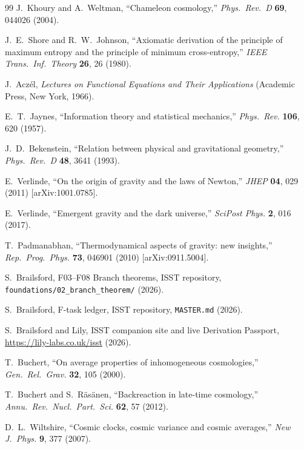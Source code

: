 \documentclass[aps,prd,twocolumn,nofootinbib,floatfix,superscriptaddress]{revtex4-2}
\begin{document}
\begin{thebibliography}{99}
 J.~Khoury and A.~Weltman, ``Chameleon
cosmology,'' \textit{Phys.~Rev.~D} \textbf{69}, 044026 (2004).

 J.~E.~Shore and R.~W.~Johnson, ``Axiomatic
derivation of the principle of maximum entropy and the principle of
minimum cross-entropy,'' \textit{IEEE Trans.~Inf.~Theory} \textbf{26},
26 (1980).

 J.~Acz\'el, \textit{Lectures on Functional
Equations and Their Applications} (Academic Press, New York, 1966).

 E.~T.~Jaynes, ``Information theory and
statistical mechanics,'' \textit{Phys.~Rev.} \textbf{106}, 620 (1957).

 J.~D.~Bekenstein, ``Relation between
physical and gravitational geometry,'' \textit{Phys.~Rev.~D}
\textbf{48}, 3641 (1993).

 E.~Verlinde, ``On the origin of gravity and
the laws of Newton,'' \textit{JHEP} \textbf{04}, 029 (2011)
[arXiv:1001.0785].

 E.~Verlinde, ``Emergent gravity and the dark
universe,'' \textit{SciPost Phys.} \textbf{2}, 016 (2017).

 T.~Padmanabhan, ``Thermodynamical aspects
of gravity: new insights,''
\textit{Rep.~Prog.~Phys.} \textbf{73}, 046901 (2010)
[arXiv:0911.5004].


 S.~Brailsford, F03--F08 Branch theorems,
ISST repository, \texttt{foundations/02\_branch\_theorem/} (2026).

 S.~Brailsford, F-task ledger,
ISST repository, \texttt{MASTER.md} (2026).

 S.~Brailsford and Lily, ISST companion site
and live Derivation Passport, \url{https://lily-labs.co.uk/isst}
(2026).


 T.~Buchert, ``On average properties of
inhomogeneous cosmologies,'' \textit{Gen.~Rel.~Grav.} \textbf{32}, 105
(2000).

 T.~Buchert and S.~R\"as\"anen,
``Backreaction in late-time cosmology,''
\textit{Annu.~Rev.~Nucl.~Part.~Sci.} \textbf{62}, 57 (2012).

 D.~L.~Wiltshire, ``Cosmic clocks, cosmic
variance and cosmic averages,'' \textit{New J.~Phys.} \textbf{9},
377 (2007).


\end{thebibliography}
\end{document}
